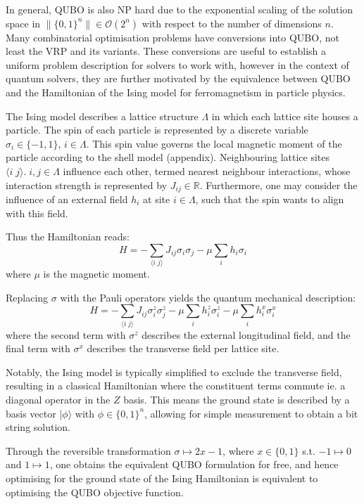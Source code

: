 \documentclass {article}
\newcommand {\qvec}[1] {\vert #1 \rangle}
\newcommand {\qeval}[1] {\langle #1 \rangle}
\begin{document}
In general, QUBO is also NP hard due to the exponential scaling of the
solution space in $\lVert \{0, 1\}^n \rVert \in \mathcal{O}(2^n)$ with respect
to the number of dimensions $n$. Many combinatorial optimisation problems have
conversions into QUBO, not least the VRP and its variants. These conversions
are useful to establish a uniform problem description for solvers to work with,
however in the context of quantum solvers, they are further motivated by the 
equivalence between QUBO and the Hamiltonian of the Ising model for
ferromagnetism in particle physics.

The Ising model describes a lattice structure $\Lambda$ in which each lattice
site houses a particle. The spin of each particle is represented by a discrete
variable $\sigma_i \in \{-1, 1\}$, $i \in \Lambda$. This spin value governs the
local magnetic moment of the particle according to the shell model (appendix).
Neighbouring lattice sites $\qeval{i\;j}. \; i, j \in \Lambda$ influence each
other, termed nearest neighbour interactions, whose interaction strength is
represented by $J_{ij} \in \mathbb R$. Furthermore, one may consider the
influence of an external field $h_i$ at site $i \in \Lambda$, such that the
spin wants to align with this field.

Thus the Hamiltonian reads:
\begin {equation}
H = - \sum_{\qeval{i\;j}} J_{ij} \sigma_i \sigma_j - \mu \sum_{i} h_i \sigma_i
\end {equation}
where $\mu$ is the magnetic moment.

Replacing $\sigma$ with the Pauli operators yields the
quantum mechanical description:
\begin {equation}
H = - \sum_{\qeval{i\;j}} J_{ij} \sigma_i^z \sigma_j^z
- \mu \sum_{i} h_i^z \sigma_i^z - \mu \sum_{i} h_i^x \sigma_i^x
\end {equation}
where the second term with $\sigma^z$ describes the external longitudinal
field, and the final term with $\sigma^x$ describes the transverse field per
lattice site.

Notably, the Ising model is typically simplified to exclude the transverse
field, resulting in a classical Hamiltonian where the constituent terms
commute ie. a diagonal operator in the $Z$ basis. This means the
ground state is described by a basis vector $\qvec{\phi}$ with
$\phi \in \{0, 1\}^n$, allowing for simple measurement to obtain a bit
string solution.

Through the reversible transformation $\sigma \mapsto 2x - 1$, where
$x \in \{0, 1\}$ s.t. $-1 \mapsto 0$ and $1 \mapsto 1$, one
obtains the equivalent QUBO formulation for free, and hence optimising for 
the ground state of the Ising Hamiltonian is equivalent to optimising the
QUBO objective function.
\end{document}
